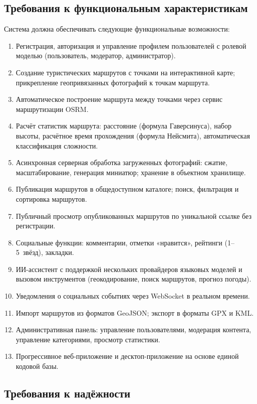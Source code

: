 \subsection{Требования к функциональным характеристикам}

Система должна обеспечивать следующие функциональные возможности:

\begin{enumerate}
  \item Регистрация, авторизация и управление профилем пользователей с ролевой моделью (пользователь, модератор, администратор).
  \item Создание туристических маршрутов с точками на интерактивной карте; прикрепление геопривязанных фотографий к точкам маршрута.
  \item Автоматическое построение маршрута между точками через сервис маршрутизации OSRM.
  \item Расчёт статистик маршрута: расстояние (формула Гаверсинуса), набор высоты, расчётное время прохождения (формула Нейсмита), автоматическая классификация сложности.
  \item Асинхронная серверная обработка загруженных фотографий: сжатие, масштабирование, генерация миниатюр; хранение в объектном хранилище.
  \item Публикация маршрутов в общедоступном каталоге; поиск, фильтрация и сортировка маршрутов.
  \item Публичный просмотр опубликованных маршрутов по уникальной ссылке без регистрации.
  \item Социальные функции: комментарии, отметки «нравится», рейтинги (1--5~звёзд), закладки.
  \item ИИ-ассистент с поддержкой нескольких провайдеров языковых моделей и вызовом инструментов (геокодирование, поиск маршрутов, прогноз погоды).
  \item Уведомления о социальных событиях через WebSocket в реальном времени.
  \item Импорт маршрутов из форматов GeoJSON; экспорт в форматы GPX и KML.
  \item Административная панель: управление пользователями, модерация контента, управление категориями, просмотр статистики.
  \item Прогрессивное веб-приложение и десктоп-приложение на основе единой кодовой базы.
\end{enumerate}

\subsection{Требования к надёжности}

